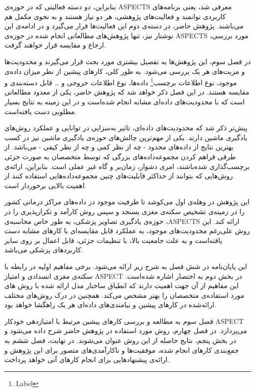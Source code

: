 بنابراین، دو دسته فعالیتی که در حوزه‌ی ASPECTS معرفی شد، یعنی برنامه‌های کاربردی توانمند و فعالیت‌های پژوهشی، هر دو نیاز هستند و به نحوی مکمل هم می‌باشند.
پژوهش حاضر، در دسته‌ی دوم این فعالیت‌ها قرار می‌گیرد
و در ادامه‌ی این نوشتار نیز، تنها پژوهش‌های مطالعاتی انجام شده در حوزه‌ی ASPECTS مورد بررسی، ارجاع و مقایسه قرار خواهند گرفت.

در فصل سوم، این پژوهش‌ها به تفصیل بیشتری مورد 
بحث قرار می‌‌گیرند و
محدودیت‌ها و مزیت‌های هر یک بررسی می‌شود.
به طور کلی، کار‌های پیشین از نظر میزان داده‌ی موجود، نوع اطلاعات 
برچسب\footnote{Label}
داده‌ها،
نوع اطلاعات خروجی و
\dots 
قابل دسته‌بندی و مقایسه هستند.
در این فصل ذکر خواهد شد که پژوهش حاضر، یکی از معدود مطالعاتی است که با محدودیت‌های داده‌ای مشابه انجام شده‌است و 
در این زمینه به نتایج بسیار مطلوبی دست یافته‌است.


پیش‌تر ذکر شد که محدودیت‌های داده‌ای، تاثیر به‌سزایی در توانایی و عملکرد روش‌های یادگیری ماشین دارند.
یکی از مهم‌ترین چالش‌های حوزه‌ی یادگیری ماشین نیز در کسب بهترین نتایج از داده‌های محدود - چه از نظر کمی و چه از نظر کیفی - می‌باشد.
از طرفی فراهم کردن مجموعه‌داده‌های بزرگی که توسط متخصصان به صورت جزئی برچسب‌گذاری شده‌باشند، امری دشوار، زمان‌بر و گاه غیر عملی است.
بنابراین، ارائه‌ی روش‌هایی که بتوانند از حداکثر قابلیت‌های چنین مجموعه‌داده‌هایی استفاده کنند از اهمیت بالایی برخوردار است.

این پژوهش در وهله‌ی اول می‌کوشد تا ظرفیت موجود در داده‌های مراکز درمانی کشور را در زمینه‌ی تشخیص سکته‌ی مغزی بسنجد و سپس روش کارآمد و تکرارپذیری را در حوزه‌ی یادگیری تصاویر پزشکی، به طور خاص محاسبه‌ی ،ASPECTS ارائه کند.
این روش علی‌رغم محدودیت‌های موجود، به عملکرد قابل مقایسه‌ای با کارهای مشابه دست یافته‌است و
به علت جامعیت بالا، با تنظیمات جزئی، قابل اعمال بر روی سایر کاربرد‌های پزشکی می‌باشد.



این پایان‌نامه در شش فصل به شرح زیر ارائه می‌شود.
برخی مفاهیم اولیه در رابطه با سکته‌ی مغزی انسدادی و امتیاز ASPECT در بخش دوم به اختصار اشاره شده‌است.
این مفاهیم از آن جهت اهمیت دارند که انطباق ساختار مدل ارائه شده با روش های مورد استفاده‌ی متخصصان را بهتر مشخص می‌کند.
همچنین در درک روش‌های مختلف ارائه‌شده در کارهای پیشین و نیامندی‌های داده‌ای هر یک راهگشا خواهد بود.

فصل سوم به مطالعه و بررسی کارهای پیشین مرتبط با امتیاز‌دهی خودکار ASPECT می‌پردازد.
در فصل چهارم، روش مورد استفاده در پژوهش حاضر شرح داده می‌شود 
و در بخش پنجم، نتایج حاصله از این روش عنوان می‌شوند.
در نهایت،‌ فصل ششم به جمع‌بندی کارهای انجام شده، موفقیت‌ها و ناکارآمدی‌های متصور برای این پژوهش و ارائه‌ی پیشنهادهایی برای انجام کارهای آتی خواهد پرداخت.